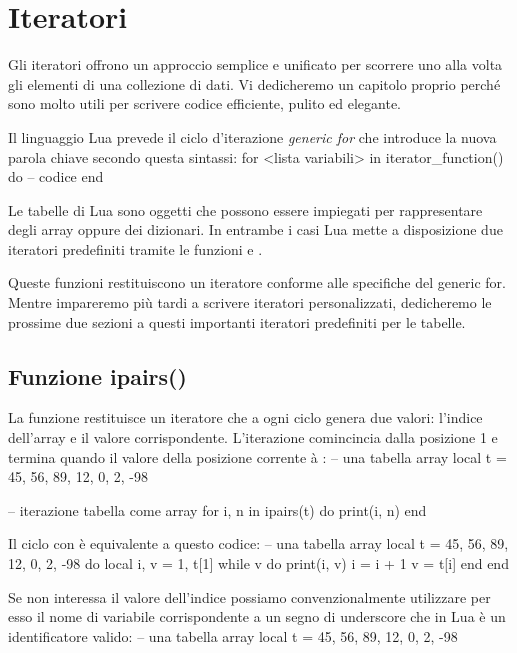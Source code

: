 
\chapter{Iteratori}

Gli iteratori offrono un approccio semplice e unificato per scorrere uno alla
volta gli elementi di una collezione di dati. Vi dedicheremo un capitolo proprio
perché sono molto utili per scrivere codice efficiente, pulito ed elegante.

Il linguaggio Lua prevede il ciclo d'iterazione \emph{generic for} che
introduce la nuova parola chiave  secondo questa sintassi:
\lines
for <lista variabili> in iterator_function() do
-- codice
end
\endlines
{}

Le tabelle di Lua sono oggetti che possono essere impiegati per rappresentare
degli array oppure dei dizionari. In entrambe i casi Lua mette a disposizione
due iteratori predefiniti tramite le funzioni  e .

Queste funzioni restituiscono un iteratore conforme alle specifiche del generic
for. Mentre impareremo più tardi a scrivere iteratori personalizzati,
dedicheremo le prossime due sezioni a questi importanti iteratori predefiniti
per le tabelle.


\section{Funzione ipairs()}

La funzione  restituisce un iteratore che a ogni ciclo genera due
valori: l'indice dell'array e il valore corrispondente. L'iterazione
comincincia dalla posizione 1 e termina quando il valore della posizione
corrente à :
\lines
-- una tabella array
local t = {45, 56, 89, 12, 0, 2, -98}

-- iterazione tabella come array
for i, n in ipairs(t) do
    print(i, n)
end
\endlines
{}

Il ciclo con  è equivalente a questo codice:
\lines
-- una tabella array
local t = {45, 56, 89, 12, 0, 2, -98}
do
    local i, v = 1, t[1]
    while v do
        print(i, v)
        i = i + 1
        v = t[i]
    end
end
\endlines
{}

Se non interessa il valore dell'indice possiamo convenzionalmente utilizzare
per esso il nome di variabile corrispondente a un segno di underscore che in
Lua è un identificatore valido:
\lines
-- una tabella array
local t = {45, 56, 89, 12, 0, 2, -98}


